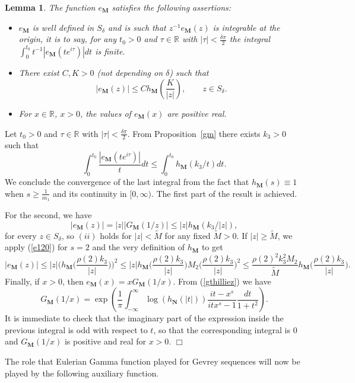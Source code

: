 \documentclass[11pt,a4paper,leqno]{article}
\theoremstyle{plain}
\newtheorem{lemma}[theo]{Lemma}
\theoremstyle{definition}
\newenvironment{proof1}{\medskip\par\noindent{\bf Proof}}{\hfill $\Box$
\medskip\par}
\def\R{\mathbb{R}}
\def\bM{\boldsymbol{M}}
\def\bN{\boldsymbol{N}}
\begin{document}
\begin{lemma}\label{propiedadese}
The function $e_{\bM}$ satisfies the following assertions:
\begin{itemize}
\item[(i)] $e_{\bM}$ is well defined in $S_{\delta}$ and is such that $z^{-1}e_{\bM}(z)$ is integrable at the origin, it is to say, for any $t_0>0$ and $\tau\in\R$ with $|\tau|<\frac{\delta\pi}{2}$ the integral $\int_{0}^{t_0}t^{-1}|e_{\bM}(te^{i\tau})|dt$ is finite.
\item[(ii)] There exist $C,K>0$ (not depending on $\delta$) such that
\begin{equation}\label{e147}|e_{\bM}(z)|\le Ch_{\bM}\left(\frac{K}{|z|}\right),\qquad z\in S_{\delta}.
\end{equation}
\item[(iii)] For $x\in\R$, $x>0$, the values of $e_{\bM}(x)$ are positive real.
\end{itemize}
\end{lemma}
\begin{proof1}
Let $t_0>0$ and $\tau\in\R$ with $|\tau|<\frac{\delta\pi}{2}$. From Proposition~\ref{gm} there exists $k_3>0$ such that
$$\int_{0}^{t_0}\frac{|e_{\bM}(te^{i\tau})|}{t}dt\le \int_{0}^{t_0}h_{\bM}(k_3/t)dt.$$
We conclude the convergence of the last integral from the fact that $h_{\bM}(s)\equiv 1$ when $s\ge\frac{1}{m_{1}}$ and its continuity in $[0,\infty)$. The first part of the result is achieved.\par
For the second, we have
$$|e_{\bM}(z)|=|z||G_{\bM}(1/z)|\le|z|h_{\bM}(k_3/|z|),$$
for every $z\in S_{\delta}$, so $(ii)$ holds for $|z|<\tilde{M}$ for any fixed $\tilde{M}>0$. If $|z|\ge \tilde{M}$, we apply (\ref{e120}) for $s=2$ and the very definition of $h_{\bM}$ to get
$$
|e_{\bM}(z)|\le |z|\Big(h_{\bM}\big(\frac{\rho(2)k_3}{|z|}\big)\Big)^2\le |z|h_{\bM}\big(\frac{\rho(2)k_3}{|z|}\big)M_2\big(\frac{\rho(2)k_3}{|z|}\big)^2\le \frac{\rho(2)^2k_3^2M_2}{\tilde{M}}h_{\bM}\big(\frac{\rho(2)k_3}{|z|}\big).
$$
Finally, if $x>0$, then $e_{\bM}(x)=xG_{\bM}(1/x)$. From (\ref{gthilliez}) we have
$$G_{\bM}(1/x)=\exp\left(\frac{1}{\pi}\int_{-\infty}^{\infty}\log\left(h_{\bN}(|t|)\right)\frac{it-x^s}{itx^s-1}\frac{dt}{1+t^2}\right).$$
It is immediate to check that the imaginary part of the expression inside the previous integral is odd with respect to $t$, so that the corresponding integral is 0 and $G_{\bM}(1/x)$ is positive and real for $x>0$.
\end{proof1}

The role that Eulerian Gamma function played for Gevrey sequences will now be played by the following auxiliary function.
\end{document}
